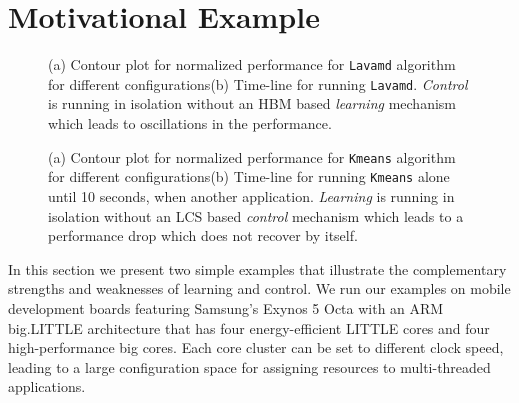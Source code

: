 \section{Motivational Example}
\label{sec:example}
\begin{figure}
  \subfloat[]
  {
    
    \label{fig:lavamd_timeline}
  }
  \caption{(a) Contour plot for normalized performance for \texttt{Lavamd} algorithm for different configurations(b) Time-line for running \texttt{Lavamd}. \emph{Control} is running in isolation without an HBM based \emph{learning} mechanism which leads to oscillations in the performance.}
  \label{fig:learning-models}
\end{figure}

\begin{figure}
  \subfloat[]
  {
    
    \label{fig:kmeans_timeline}    
  }
  \caption{(a) Contour plot for normalized performance for \texttt{Kmeans} algorithm for different configurations(b) Time-line for running \texttt{Kmeans} alone until 10 seconds, when another application. \emph{Learning} is running in isolation without an LCS based \emph{control} mechanism which leads to a performance drop which does not recover by itself.}
  \label{fig:learning-models}
\end{figure}

In this section we present two simple examples that illustrate the
complementary strengths and weaknesses of learning and control.  We
run our examples on mobile development boards featuring Samsung's
Exynos 5 Octa with an ARM big.LITTLE architecture that has four
energy-efficient LITTLE cores and four high-performance big cores.
Each core cluster can be set to different clock speed, leading to a
large configuration space for assigning resources to multi-threaded
applications.

